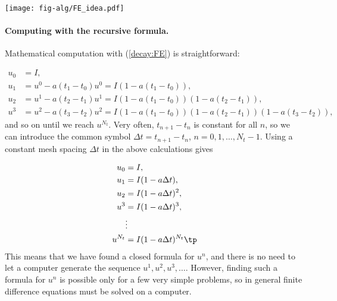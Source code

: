 \documentclass[graybox,sectrefs,envcountresetchap,open=right,final]{svmonodo}
\begin{document}
\vspace{3mm}




\vspace{3mm}





\centerline{\texttt{[image: fig-alg/FE\_idea.pdf]}}





\vspace{3mm}




\vspace{3mm}



\paragraph{Computing with the recursive formula.}
Mathematical computation with (\ref{decay:FE}) is straightforward:

\begin{align*}
u_0 &= I,\\ 
u_1 & = u^0 - a(t_{1} -t_0)u^0 = I(1-a(t_1-t_0)),\\ 
u_2 & = u^1 - a(t_{2} -t_1)u^1 = I(1-a(t_1-t_0))(1 - a(t_2-t_1)),\\ 
u^3 &= u^2 - a(t_{3} -t_2)u^2 = I(1-a(t_1-t_0))(1 - a(t_2-t_1))(1 - a(t_3-t_2)),
\end{align*}
and so on until we reach $u^{N_t}$.
Very often, $t_{n+1}-t_n$ is constant for all $n$, so we can introduce
the common symbol
$\Delta t = t_{n+1}-t_n$, $n=0,1,\ldots,N_t-1$.
Using a constant mesh spacing $\Delta t$ in the above calculations gives

\begin{align*}
u_0 &= I,\\ 
u_1 & = I(1-a\Delta t),\\ 
u_2 & = I(1-a\Delta t)^2,\\ 
u^3 &= I(1-a\Delta t)^3,\\ 
&\vdots\\ 
u^{N_t} &= I(1-a\Delta t)^{N_t}\tp
\end{align*}
This means that we have found a closed formula for $u^n$, and there is
no need to let a computer generate the sequence $u^1, u^2, u^3, \ldots$.
However, finding such a formula for $u^n$ is possible only for a few very
simple problems, so in general finite difference equations must be
solved on a computer.
\end{document}
